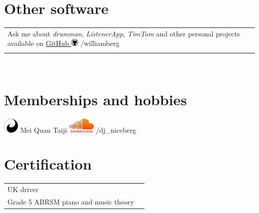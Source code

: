 \documentclass[10pt]{article} %
\begin{document}

\section{Other software}
\hfill \break

\begin{tabular}{l l}

Ask me about \textit{drumman}, \textit{ListenerApp}, \textit{TimTom} and other personal projects available on \href{http://github.com/williamberg}{GitHub \includegraphics[height=1em]{res/github}} /williamberg & \\
 & \\

\end{tabular}\\[10pt]


\section{Memberships and hobbies}
\hfill \break

\href{http://www.meiquan.co.uk/}{\includegraphics[height=2em]{res/tai_chi_symbol}} Mei Quan Taiji
\hspace{3em}
\href{https://soundcloud.com/dj_niceberg/}{\includegraphics[height=2em]{res/soundcloud}} /dj\_niceberg
\\[10pt]


\section{Certification}
\hfill \break

\begin{tabular}{l l}

UK driver & \\
Grade 5 ABRSM piano and music theory

\end{tabular}\\[10pt]
\end{document}

